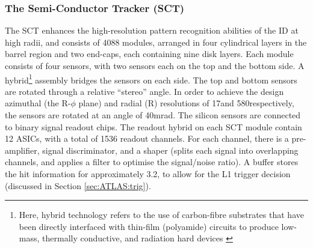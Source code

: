 \subsubsection{The Semi-Conductor Tracker (SCT)}
The SCT enhances the high-resolution pattern recognition abilities of the ID at high radii, and consists of 4088 modules, arranged in four cylindrical layers in the barrel region and two end-caps, each containing nine disk layers. Each module consists of four sensors, with two sensors each on the top and the bottom side. A hybrid\footnote{Here, hybrid technology refers to the use of carbon-fibre substrates that have been directly interfaced with thin-film (polyamide) circuits to produce low-mass, thermally conductive, and radiation hard devices \cite{Atlas:Hybrids}} assembly bridges the sensors on each side. The top and bottom sensors are rotated through a relative ``stereo'' angle. In order to achieve the design azimuthal (the R-$\phi$ plane) and radial (R) resolutions of 17\microns and 580\microns respectively, the sensors are rotated at an angle of 40mrad. The silicon sensors are connected to binary signal readout chips.
The readout hybrid on each SCT module contain 12 ASICs, with a total of 1536 readout channels. For each channel, there is a pre-amplifier, signal discriminator, and a shaper (splits each signal into overlapping channels, and applies a filter to optimise the signal/noise ratio). A buffer stores the hit information for approximately 3.2\microseconds, to allow for the L1 trigger decision (discussed in Section \ref{sec:ATLAS:trig}). 
